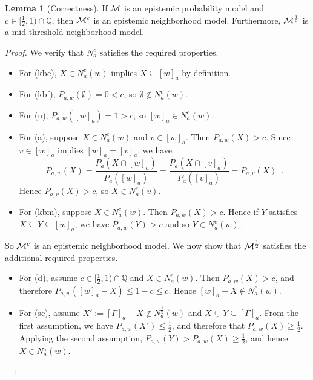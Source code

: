 \documentclass[12pt]{article}
\theoremstyle{definition}
\newtheorem{lemma}[theorem]{Lemma}
\newcommand{\Rat}{\mathbb{Q}}  %
\newcommand{\M}{{\cal M}}      %
\begin{document}
\begin{lemma}[Correctness]
  \label{lemma:correctness}
  If $\M$ is an epistemic probability model and $c\in[\frac
  12,1)\cap\Rat$, then $\M^c$ is an epistemic neighborhood model.
  Furthermore, $\M^{\frac 12}$ is a mid-threshold neighborhood model.
\end{lemma}
\begin{proof}
  We verify that $N^c_a$ satisfies the required properties.
  \begin{itemize}
  \item For (kbc), $X\in N^c_a(w)$ implies $X\subseteq[w]_a$ by
    definition.

  \item For (kbf), $P_{a,w}(\emptyset)=0<c$, so $\emptyset\notin N^c_a(w)$.

  \item For (n), $P_{a,w}([w]_a) = 1 > c$, so
    $[w]_a \in N^c_a(w)$.

  \item For (a), suppose $X \in N^c_a(w)$ and $v\in [w]_a$.  Then
    $P_{a,w}(X)>c$.  Since $v\in [w]_a$ implies $[w]_a = [v]_a$, we
    have
    \[
    P_{a,w}(X) = 
    \frac{P_a(X\cap[w]_a)}{P_a([w]_a)} =
    \frac{P_a(X\cap[v]_a)}{P_a([v]_a)} =
    P_{a,v}(X) \enspace.
    \]
    Hence $P_{a,v}(X)>c$, so $X \in N^c_a(v)$.

  \item For (kbm), suppose $X \in N^c_a(w)$.  Then $P_{a,w}(X)>c$.
    Hence if $Y$ satisfies $X \subseteq Y \subseteq [w]_a$, we have
    $P_{a,w}(Y)>c$ and so $Y \in N^c_a(w)$.
  \end{itemize}
  So $\M^c$ is an epistemic neighborhood model.  We now show that
  $\M^{\frac 12}$ satisfies the additional required properties.
  \begin{itemize}
  \item For (d), assume $c\in[\frac 12,1)\cap\Rat$ and $X \in
    N^c_a(w)$.  Then $P_{a,w}(X) > c$, and therefore $P_{a,w}([w]_a -
    X) \leq 1-c\leq c$. Hence $[w]_a - X \notin N^c_a(w)$.

  \item For (sc), assume $X':=[\Gamma]_a-X\notin N^{\frac 12}_a(w)$
    and $X\subsetneq Y\subseteq[\Gamma]_a$.  From the first
    assumption, we have $P_{a,w}(X') \leq \frac 12$, and therefore
    that $P_{a,w}(X)\geq \frac 12$.  Applying the second assumption,
    $P_{a,w}(Y) > P_{a,w}(X)\geq \frac 12$, and hence $X\in N^{\frac
      12}_a(w)$.


\end{itemize}
\end{proof}
\end{document}
